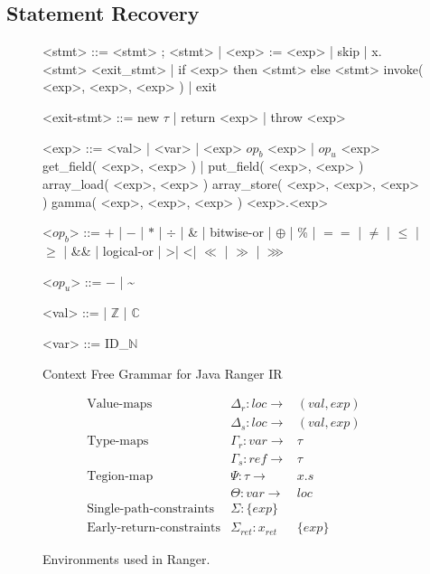 \subsection{Statement Recovery}
\label{sec:static-analysis}
\begin{figure}
\begin{grammar}
<stmt> ::= <stmt> ; <stmt> | <exp> := <exp> | skip | x.<stmt> 
\alt <exit_stmt> | if <exp> then <stmt> else <stmt> 
\alt invoke( <exp>, <exp>, <exp> )  | exit

<exit-stmt> ::=  new $\tau$  | return <exp> |  throw <exp> 

<exp>  ::= <val> | <var> | <exp> $op_b$ <exp> | $op_u$ <exp>
\alt get_field( <exp>, <exp> ) | put_field( <exp>, <exp> )
\alt array_load( <exp>, <exp> )  
\alt array_store( <exp>, <exp>, <exp> ) 
\alt gamma( <exp>, <exp>, <exp> ) 
\alt <exp>.<exp>

<$op_b$> ::= $+$ | $-$ | $*$ | $\div$ | \& | bitwise-or | $\oplus$ | \% | $==$ | $\neq$ | $\leq$ | $\geq$ | \&\& | logical-or | \textgreater | \textless | $\ll$ | $\gg$ | $\ggg$

<$op_u$> ::= $-$ | \textasciitilde

<val> ::= \unit | $\mathbb{Z}$ |  $\mathbb{C}$

<var> ::= ID_$\mathbb{N}$
\end{grammar}
\caption{Context Free Grammar for Java Ranger IR}
\label{fig:grammar}
\end{figure}


\begin{figure}
$$
\begin{array}{lllll}
\text{Value-maps} & \Delta_r: loc \rightarrow & ( val, exp) &&
\\
& \Delta_s: loc \rightarrow & ( val, exp) &&
\\
\text{Type-maps}  & \Gamma_r: var \rightarrow & \tau & &
\\
& \Gamma_s: ref \rightarrow & \tau&&
\\
\text{Tegion-map} & \Psi: \tau \rightarrow & x.s &&
\\
& \Theta: var \rightarrow & loc &&
\\
\text{Single-path-constraints} & \Sigma: \{exp\} &  &  & 
\\
\text{Early-return-constraints} & \Sigma_{ret}: x_{ret} & \{exp\} &  & 
\end{array}
$$
\caption{Environments used in Ranger.}
\label{fig:environment}
\end{figure}


